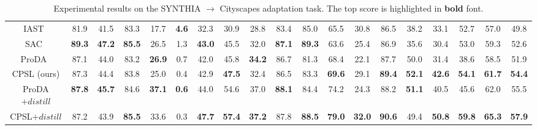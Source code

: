 \documentclass[10pt,twocolumn,letterpaper]{article}
\begin{document}
\begin{table*}[!ht]
{\begin{tabular}{c|cccccccccccccccc|c|c}
				IAST~\cite{mei2020instance}     & 81.9 & 41.5    & 83.3     & 17.7 & \textbf{4.6}   & 32.3 & 30.9  & 28.8 & 83.4       & 85.0 & 65.5   & 30.8  & 86.5 & 38.2 & 33.1      & 52.7 & 57.0 & 49.8 \\
				SAC~\cite{araslanov2021self}      & \textbf{89.3} & \textbf{47.2 }   & \textbf{85.5 }    & 26.5 & 1.3   & \textbf{43.0} & 45.5  & 32.0 & \textbf{87.1 }      & \textbf{89.3}	& 63.6   & 25.4  & 86.9 & 35.6 & 30.4      & 53.0 & 59.3 & 52.6 \\
				ProDA~\cite{zhang2021prototypical}      & 87.1 &44.0   &83.2    & \textbf{26.9} & 0.7   & 42.0 & 45.8 & \textbf{34.2} & 86.7      & 81.3	& 68.4   & 22.1  & 87.7 & 50.0 & 31.4      & 38.6 &58.5  & 51.9\\
CPSL (ours)    &   87.3   &    44.4     &    83.8      &   25.0   &   0.4    &   42.9   &   \textbf{47.5}    &   32.4   &     86.5       &    83.3  &    \textbf{69.6}    &   29.1    &   \textbf{89.4 }  &   \textbf{52.1}   &     \textbf{42.6 }     &  \textbf{ 54.1 }  &   \textbf{61.7}   &   \textbf{54.4 }  \\ 
				\midrule[1pt]
				ProDA$+distill$ & \textbf{87.8} 	&	\textbf{45.7}	&  84.6		& 	\textbf{37.1} 	&	\textbf{0.6} 	&	44.0	&	54.6	&	37.0	&	\textbf{88.1}	&	84.4	&	74.2	&	24.3	&	88.2	&	\textbf{51.1}	&	40.5	&	45.6	&  	62.0	&	55.5\\
				CPSL$+distill$ & 87.2 	&	43.9	&  \textbf{85.5}		& 	33.6 	&	0.3 	&	\textbf{47.7}	&	\textbf{57.4}	&	\textbf{37.2}	&	87.8	&	\textbf{88.5}	&	\textbf{79.0}	&	\textbf{32.0}	&	\textbf{90.6}	&	49.4	&	\textbf{50.8}	&	\textbf{59.8}	&  	\textbf{65.3}	&	\textbf{57.9}\\
				\bottomrule[1.5pt]
		\end{tabular}}
		\vspace{-0.5em}	
		\caption{Experimental results on the SYNTHIA $\to$ Cityscapes adaptation task. The top score is highlighted in {\bf bold} font.}
		\vspace{-1.0em}	
		\label{0tab2}
	\end{table*}
	
	
\end{document}

